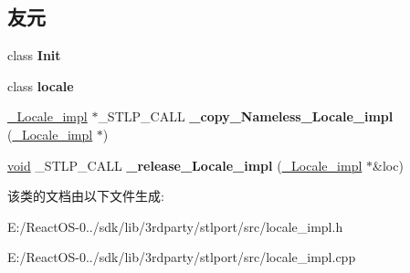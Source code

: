 \subsection*{友元}
\begin{DoxyCompactItemize}
\item 
\mbox{\label{class___locale__impl_ab3afe096d892713710032f1f1cd15948}} 
class {\bfseries Init}
\item 
\mbox{\label{class___locale__impl_a0a09223e17db306b813d8b07b4b344fc}} 
class {\bfseries locale}
\item 
\mbox{\label{class___locale__impl_aec8849ac53cbcff7ce1f544af19e1404}} 
\hyperlink{class___locale__impl}{\+\_\+\+Locale\+\_\+impl} $\ast$\+\_\+\+S\+T\+L\+P\+\_\+\+C\+A\+LL {\bfseries \+\_\+copy\+\_\+\+Nameless\+\_\+\+Locale\+\_\+impl} (\hyperlink{class___locale__impl}{\+\_\+\+Locale\+\_\+impl} $\ast$)
\item 
\mbox{\label{class___locale__impl_a0001eca243afb7b802ead94092976391}} 
\hyperlink{interfacevoid}{void} \+\_\+\+S\+T\+L\+P\+\_\+\+C\+A\+LL {\bfseries \+\_\+release\+\_\+\+Locale\+\_\+impl} (\hyperlink{class___locale__impl}{\+\_\+\+Locale\+\_\+impl} $\ast$\&loc)
\end{DoxyCompactItemize}


该类的文档由以下文件生成\+:\begin{DoxyCompactItemize}
\item 
E\+:/\+React\+O\+S-\/0../sdk/lib/3rdparty/stlport/src/locale\+\_\+impl.\+h\item 
E\+:/\+React\+O\+S-\/0../sdk/lib/3rdparty/stlport/src/locale\+\_\+impl.\+cpp\end{DoxyCompactItemize}
